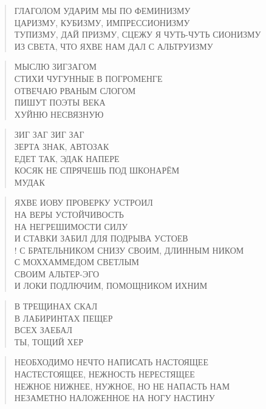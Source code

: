 \poemtitle{***}
\begin{verse}
ГЛАГОЛОМ УДАРИМ МЫ ПО ФЕМИНИЗМУ\\
ЦАРИЗМУ, КУБИЗМУ, ИМПРЕССИОНИЗМУ\\
ТУПИЗМУ, ДАЙ ПРИЗМУ, СЦЕЖУ Я ЧУТЬ-ЧУТЬ СИОНИЗМУ\\
ИЗ СВЕТА, ЧТО ЯХВЕ НАМ ДАЛ С АЛЬТРУИЗМУ
\end{verse}

\poemtitle{***}
\begin{verse}
МЫСЛЮ ЗИГЗАГОМ\\
СТИХИ ЧУГУННЫЕ В ПОГРОМЕНГЕ\\
ОТВЕЧАЮ РВАНЫМ СЛОГОМ\\
ПИШУТ ПОЭТЫ ВЕКА\\
ХУЙНЮ НЕСВЯЗНУЮ
\end{verse}

\poemtitle{***}
\begin{verse}
ЗИГ ЗАГ ЗИГ ЗАГ\\
ЗЕРТА ЗНАК, АВТОЗАК\\
ЕДЕТ ТАК, ЭДАК НАПЕРЕ\\
КОСЯК НЕ СПРЯЧЕШЬ ПОД ШКОНАРЁМ\\
МУДАК
\end{verse}

\poemtitle{***}
\begin{verse}
ЯХВЕ ИОВУ ПРОВЕРКУ УСТРОИЛ\\
НА ВЕРЫ УСТОЙЧИВОСТЬ\\
НА НЕГРЕШИМОСТИ СИЛУ\\
И СТАВКИ ЗАБИЛ ДЛЯ ПОДРЫВА УСТОЕВ\\!
С БРАТЕЛЬНИКОМ СНИЗУ СВОИМ, ДЛИННЫМ НИКОМ \\
С МОХХАММЕДОМ СВЕТЛЫМ\\
СВОИМ АЛЬТЕР-ЭГО\\
И ЛОКИ ПОДЛЮЧИМ, ПОМОЩНИКОМ ИХНИМ
\end{verse}

\poemtitle{***}
\begin{verse}
В ТРЕЩИНАХ СКАЛ\\
В ЛАБИРИНТАХ ПЕЩЕР\\
ВСЕХ ЗАЕБАЛ\\
ТЫ, ТОЩИЙ ХЕР
\end{verse}

\poemtitle{***}
\begin{verse}
НЕОБХОДИМО НЕЧТО НАПИСАТЬ НАСТОЯЩЕЕ\\
НАСТЕСТОЯЩЕЕ, НЕЖНОСТЬ НЕРЕСТЯЩЕЕ\\
НЕЖНОЕ НИЖНЕЕ, НУЖНОЕ, НО НЕ НАПАСТЬ НАМ\\
НЕЗАМЕТНО НАЛОЖЕННОЕ НА НОГУ НАСТИНУ
\end{verse}

